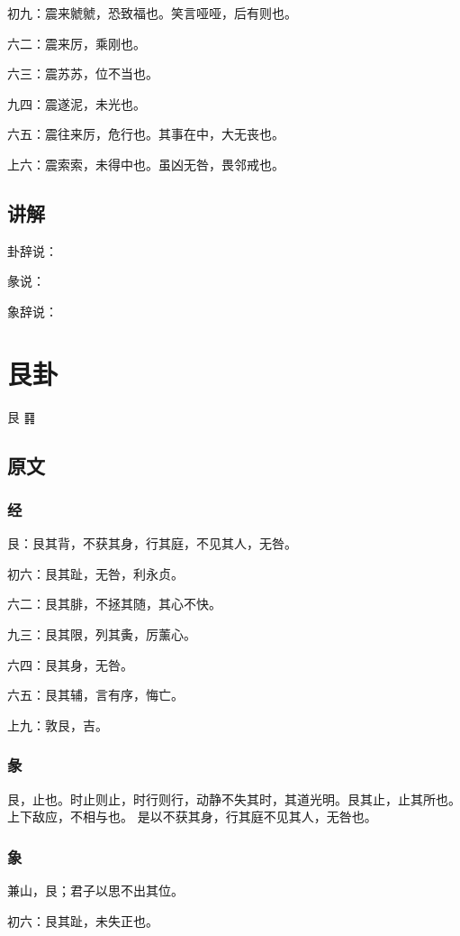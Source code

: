\documentclass[12pt,oneside]{book}
\begin{document}
初九：震来虩虩，恐致福也。笑言哑哑，后有则也。

六二：震来厉，乘刚也。

六三：震苏苏，位不当也。

九四：震遂泥，未光也。

六五：震往来厉，危行也。其事在中，大无丧也。

上六：震索索，未得中也。虽凶无咎，畏邻戒也。


\section{讲解}
卦辞说：

彖说：

象辞说：



\chapter{艮卦}
艮 {\Large ䷳}


\section{原文}

\subsection{经}
艮：艮其背，不获其身，行其庭，不见其人，无咎。

初六：艮其趾，无咎，利永贞。

六二：艮其腓，不拯其随，其心不快。

九三：艮其限，列其夤，厉薰心。

六四：艮其身，无咎。

六五：艮其辅，言有序，悔亡。

上九：敦艮，吉。


\subsection{彖}
艮，止也。时止则止，时行则行，动静不失其时，其道光明。艮其止，止其所也。上下敌应，不相与也。 是以不获其身，行其庭不见其人，无咎也。

\subsection{象}
兼山，艮；君子以思不出其位。

初六：艮其趾，未失正也。
\end{document}
